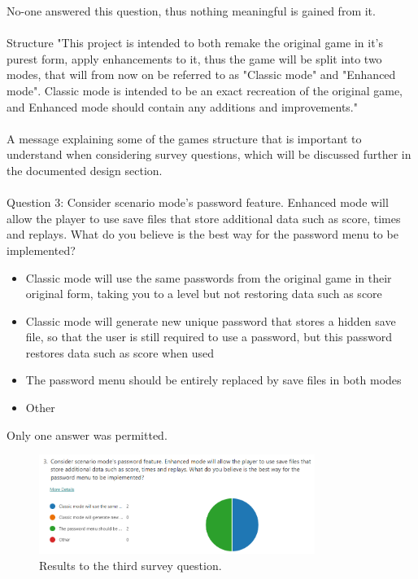 \documentclass{report}
\begin{document}
No-one answered this question, thus nothing meaningful is gained from it.
\\\\
Structure
"This project is intended to both remake the original game in it's purest form, apply enhancements to it, thus the game will be split into two modes, that will from now on be referred to as "Classic mode" and "Enhanced mode". Classic mode is intended to be an exact recreation of the original game, and Enhanced mode should contain any additions and improvements."
\\\\
A message explaining some of the games structure that is important to understand when considering survey questions, which will be discussed further in the documented design section.
\\\\
Question 3: Consider scenario mode's password feature. Enhanced mode will allow the player to use save files that store additional data such as score, times and replays. What do you believe is the best way for the password menu to be implemented?
\begin{itemize}
    \renewcommand\labelitemi{--}
    \item Classic mode will use the same passwords from the original game in their original form, taking you to a level but not restoring data such as score
    \item Classic mode will generate new unique password that stores a hidden save file, so that the user is still required to use a password, but this password restores data such as score when used
    \item The password menu should be entirely replaced by save files in both modes
    \item Other
\end{itemize}
Only one answer was permitted.

\begin{figure}[ht]
    \centering
    \includegraphics[width=0.8\textwidth]{survey3.png}
    \caption{\label{fig:survey3}Results to the third survey question.}
\end{figure}
\end{document}
